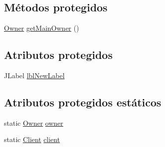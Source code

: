 \subsection*{Métodos protegidos}
\begin{DoxyCompactItemize}
\item 
\mbox{\hyperlink{classdomain_1_1_owner}{Owner}} \mbox{\hyperlink{classgui_1_1_main_g_u_i_afceb38ceda3cd700a57327b048ab7b10}{get\+Main\+Owner}} ()
\end{DoxyCompactItemize}
\subsection*{Atributos protegidos}
\begin{DoxyCompactItemize}
\item 
J\+Label \mbox{\hyperlink{classgui_1_1_main_g_u_i_a0fc72962f06022026150f3d01638f929}{lbl\+New\+Label}}
\end{DoxyCompactItemize}
\subsection*{Atributos protegidos estáticos}
\begin{DoxyCompactItemize}
\item 
static \mbox{\hyperlink{classdomain_1_1_owner}{Owner}} \mbox{\hyperlink{classgui_1_1_main_g_u_i_af293b8b4096d52f9b4747f898f5599b3}{owner}}
\item 
static \mbox{\hyperlink{classdomain_1_1_client}{Client}} \mbox{\hyperlink{classgui_1_1_main_g_u_i_ac0f95c6d3d66c5e0077f0497dfe327ad}{client}}
\end{DoxyCompactItemize}
